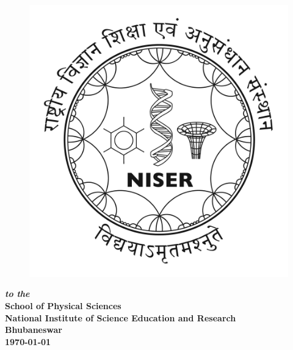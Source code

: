 \documentclass{article}
\begin{document}
\vfill
\begin{center}
\begin{figure}[h!]
\centering
\includegraphics[scale=0.2]{Images/logo1.jpg}
\end{figure}
 {\bf {\em to the }} \\
{\bf {\large School of Physical Sciences}} \\
{\bf {\large National Institute of Science Education and Research}} \\
{\bf Bhubaneswar} \\
{\bf \today} 
\end{center}










\newpage
{}
\begin{center}
 \tableofcontents  
 \newpage
 \listoffigures
 \listoftables 
\end{center}
\restoregeometry
\end{document}

